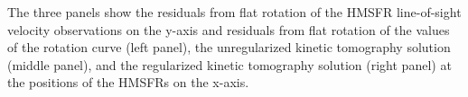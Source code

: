 \label{fig:hmsfr_comparison}
The three panels show the residuals from flat rotation of the \citet{2009ApJ...700..137R} HMSFR line-of-sight velocity observations on the y-axis and residuals from flat rotation of the values of the \citet{1985ApJ...295..422C} rotation curve (left panel), the unregularized kinetic tomography solution (middle panel), and the regularized kinetic tomography solution (right panel) at the positions of the HMSFRs on the x-axis.
